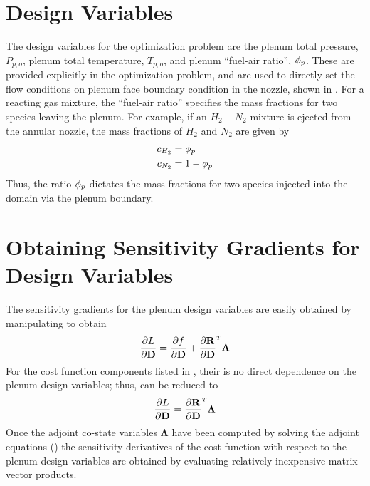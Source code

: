\section{Design Variables}

The design variables for the optimization problem are the plenum total pressure,
$P_{p,o}$, plenum total temperature, $T_{p,o}$, and plenum ``fuel-air ratio'',
$\phi_p$.  These are provided explicitly in the optimization problem, and are used
to directly set the flow conditions on plenum face boundary condition in the
nozzle, shown in .  For a reacting gas mixture, the
``fuel-air ratio'' specifies the mass fractions for two species leaving the
plenum.  For example, if an $H_2-N_2$ mixture is ejected from the annular
nozzle, the mass fractions of $H_2$ and $N_2$ are given by
\begin{equation}
  \begin{aligned}
    c_{H_2} &= \phi_p \\
    c_{N_2} &= 1 - \phi_p
  \end{aligned}
  \label{fuel-air-def}
\end{equation}
Thus, the ratio $\phi_p$ dictates the mass fractions for two species injected into
the domain via the plenum boundary.

\section{Obtaining Sensitivity Gradients for Design Variables}

The sensitivity gradients for the plenum design variables are easily obtained by
manipulating  to obtain
\begin{equation}
  \pd{L}{\md} = \pd{f}{\md} + \rtdiff{}{\md} \mathbf{\Lambda}
  \label{obj-linearization1}
\end{equation}
For the cost function components listed in , their is
no direct dependence on the plenum design variables; thus,
 can be reduced to
\begin{equation}
  \pd{L}{\md} = \rtdiff{}{\md} \mathbf{\Lambda}
  \label{obj-linearization2}
\end{equation}
Once the adjoint co-state variables $\mathbf{\Lambda}$ have been computed by
solving the adjoint equations () the sensitivity derivatives
of the cost function with respect to the plenum design variables are obtained by
evaluating relatively inexpensive matrix-vector products.

